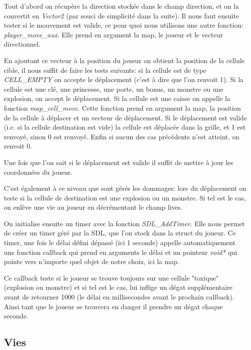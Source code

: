 \documentclass[12pt,a4paper]{article} %
\begin{document}
Tout d'abord on récupère la direction stockée dans le champ direction, et on la convertit en \emph{Vector2} (par souci de simplicité dans la suite). Il nous faut ensuite tester si le mouvement est valide, ce pour quoi nous utilisons une autre fonction: \emph{player\_move\_aux}. Elle prend en argument la map, le joueur et le vecteur directionnel.

En ajoutant ce vecteur à la position du joueur on obtient la position de la cellule cible, il nous suffit de faire les tests suivants: si la cellule est de type \emph{CELL\_EMPTY} on accepte le déplacement (c'est à dire que l'on renvoit 1). Si la cellule est une clé, une princesse, une porte, un bonus, un monstre ou une explosion, on accept le déplacement. Si la cellule est une caisse on appelle la fonction \emph{map\_cell\_move}. Cette fonction prend en argument la map, la position de la cellule à déplacer et un vecteur de déplacement. Si le déplacement est valide (i.e. si la cellule destination est vide) la cellule est déplacée dans la grille, et 1 est renvoyé, sinon 0 est renvoyé. Enfin si aucun des cas précédents n'est atteint, on renvoit 0.

Une fois que l'on sait si le déplacement est valide il suffit de mettre à jour les coordonnées du joueur.

C'est également à ce niveau que sont gérés les dommages: lors du déplacement on teste si la cellule de destination est une explosion ou un monstre. Si tel est le cas, on enlève une vie au joueur en décrémentant le champ lives.

On initialise ensuite un timer avec la fonction \emph{SDL\_AddTimer}. Elle nous permet de créer un timer géré par la SDL, que l'on stock dans la struct du joueur. Ce timer, une fois le délai défini dépassé (ici 1 seconde) appelle automatiquement une fonction callback qui prend en arguments le délai et un pointeur \emph{void*} qui pointe vers n'importe quel objet de notre choix, ici la map.

Ce callback teste si le joueur se trouve toujours sur une cellule "toxique" (explosion ou monstre) et si tel est le cas, lui inflige un dégat supplémentaire avant de retourner 1000 (le délai en millisecondes avant le prochain callback). Ainsi tant que le joueur se trouvera en danger il prendre un dégat chaque seconde.

\subsection{Vies}
\end{document}
